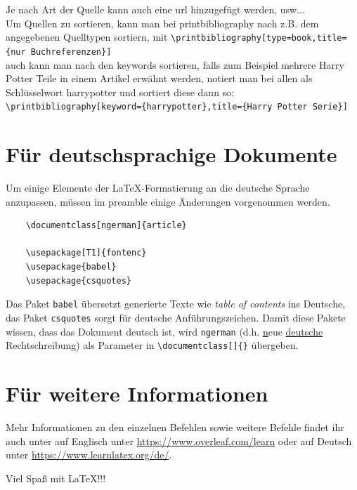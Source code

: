 \documentclass[ngerman]{scrreport}
\begin{document}
Je nach Art der Quelle kann auch eine url hinzugefügt werden, usw...\\
Um Quellen zu sortieren, kann man bei printbibliography nach z.B. dem angegebenen Quelltypen sortiern, mit {\color{blue}\verb|\printbibliography[type=book,title={nur Buchreferenzen}]|}\\
auch kann man nach den keywords sortieren, falls zum Beispiel mehrere Harry Potter Teile in einem Artikel erwähnt werden, notiert man bei allen als Schlüsselwort harrypotter und sortiert diese dann so: {\color{blue}\verb|\printbibliography[keyword={harrypotter},title={Harry Potter Serie}]|}\\

\section{Für deutschsprachige Dokumente}

Um einige Elemente der \LaTeX-Formatierung an die deutsche Sprache anzupassen, müssen im preamble einige Änderungen vorgenommen werden.

\begin{verbatim}
    \documentclass[ngerman]{article}

    \usepackage[T1]{fontenc}
    \usepackage{babel}
    \usepackage{csquotes}
\end{verbatim}

Das Paket \texttt{babel} übersetzt generierte Texte wie \textit{table of contents} ins Deutsche, das Paket \texttt{csquotes} sorgt für deutsche Anführungszeichen. Damit diese Pakete wissen, dass das Dokument deutsch ist, wird \texttt{ngerman} (d.h. \underline{n}eue \underline{deutsche} Rechtschreibung) als Parameter in \verb|\documentclass[]{}| übergeben.

\section{Für weitere Informationen}
Mehr Informationen zu den einzelnen Befehlen sowie weitere Befehle findet ihr auch unter auf Englisch unter \url{https://www.overleaf.com/learn} oder auf Deutsch unter \url{https://www.learnlatex.org/de/}.
\vspace{2cm}

{\huge Viel Spaß mit \LaTeX{!!!}}

\printbibliography[title={Bücher}]
\end{document}
